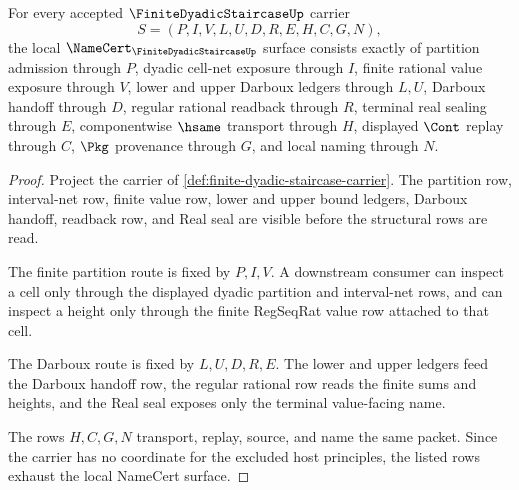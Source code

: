 \begin{theorem}
\label{thm:finite-dyadic-staircase-namecert-obligations}
For every accepted $\FiniteDyadicStaircaseUp$ carrier
$$
S=(P,I,V,L,U,D,R,E,H,C,G,N),
$$
the local $\NameCert_{\FiniteDyadicStaircaseUp}$ surface consists exactly of partition admission through $P$, dyadic cell-net exposure through $I$, finite rational value exposure through $V$, lower and upper Darboux ledgers through $L,U$, Darboux handoff through $D$, regular rational readback through $R$, terminal real sealing through $E$, componentwise $\hsame$ transport through $H$, displayed $\Cont$ replay through $C$, $\Pkg$ provenance through $G$, and local naming through $N$.
\end{theorem}
\begin{proof}
Project the carrier of \autoref{def:finite-dyadic-staircase-carrier}. The partition row, interval-net row, finite value row, lower and upper bound ledgers, Darboux handoff, readback row, and Real seal are visible before the structural rows are read.

The finite partition route is fixed by $P,I,V$. A downstream consumer can inspect a cell only through the displayed dyadic partition and interval-net rows, and can inspect a height only through the finite RegSeqRat value row attached to that cell.

The Darboux route is fixed by $L,U,D,R,E$. The lower and upper ledgers feed the Darboux handoff row, the regular rational row reads the finite sums and heights, and the Real seal exposes only the terminal value-facing name.

The rows $H,C,G,N$ transport, replay, source, and name the same packet. Since the carrier has no coordinate for the excluded host principles, the listed rows exhaust the local NameCert surface.
\end{proof}

